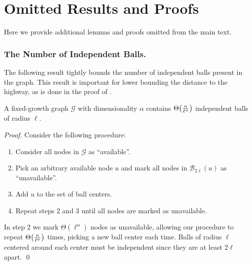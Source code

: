 \section{Omitted Results and Proofs} \label{sec:misc-proofs}

\vspace*{-\medskipamount}

Here we provide additional lemmas and proofs omitted from
the main text.
\vspace*{-\medskipamount}

\subsubsection{The Number of Independent Balls.}
%
The following result tightly bounds the number of independent balls present
in the graph.
This result is important for lower bounding the distance to the highway, as is
done in the proof of .
%
\vspace*{-\medskipamount}
\vspace*{-\medskipamount}
\begin{lemma} \label{lem:indep-balls}
	A fixed-growth graph $\mathcal{G}$ with dimensionality $\alpha$ contains
	$\Theta\pars*{\frac{n}{\ell^\alpha}}$ independent balls of radius $\ell$.
\end{lemma}
%
\begin{proof}
	Consider the following procedure:
	\begin{enumerate}
		\item Consider all nodes in $\mathcal{G}$ as ``available''.
		
		\item Pick an arbitrary available node $u$ and mark all nodes in
		$\mathcal{B}_{2\ell}(u)$ as ``unavailable''.

		\item Add $u$ to the set of ball centers.
		
		\item Repeat steps 2 and 3 until all nodes are marked as unavailable.
	\end{enumerate}

	In step 2 we mark $\Theta(\ell^\alpha)$ nodes as unavailable,
	allowing our procedure to repeat $\Theta\pars*{\frac{n}{\ell^\alpha}}$
	times, picking a new ball center each time.
	Balls of radius $\ell$ centered around each center must be
	independent since they are at least $2\ell$ apart.
	\qed
\end{proof}

